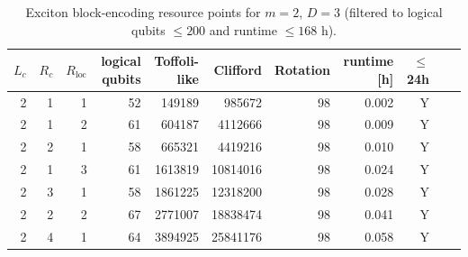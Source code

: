 \begin{table}[t]
\centering
\scriptsize
\caption{Exciton block-encoding resource points for $m=2$, $D=3$ (filtered to logical qubits $\leq 200$ and runtime $\leq 168$ h).}
\begin{tabularx}{\linewidth}{rrrrrrrrrrr}
\toprule
$L_c$ & $R_c$ & $R_{\mathrm{loc}}$ & logical qubits & Toffoli-like & Clifford & Rotation & runtime [h] & $\leq$ 24h \\
\midrule
2 & 1 & 1 & 52 & 149189 & 985672 & 98 & 0.002 & Y \\
2 & 1 & 2 & 61 & 604187 & 4112666 & 98 & 0.009 & Y \\
2 & 2 & 1 & 58 & 665321 & 4419216 & 98 & 0.010 & Y \\
2 & 1 & 3 & 61 & 1613819 & 10814016 & 98 & 0.024 & Y \\
2 & 3 & 1 & 58 & 1861225 & 12318200 & 98 & 0.028 & Y \\
2 & 2 & 2 & 67 & 2771007 & 18838474 & 98 & 0.041 & Y \\
2 & 4 & 1 & 64 & 3894925 & 25841176 & 98 & 0.058 & Y \\
\bottomrule
\end{tabularx}
\end{table}
